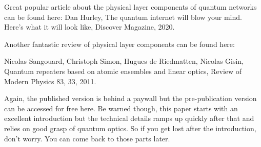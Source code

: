 Great popular article about the physical layer components of quantum networks can be found here:
Dan Hurley, The quantum internet will blow your mind. Here’s what it will look like, Discover Magazine, 2020.

Another fantastic review of physical layer components can be found here:

Nicolas Sangouard, Christoph Simon, Hugues de Riedmatten, Nicolas Gisin, Quantum repeaters based on atomic ensembles and linear optics, Review of Modern Physics 83, 33, 2011.

Again, the published version is behind a paywall but the pre-publication version can be accessed for free here. Be warned though, this paper starts with an excellent introduction but the technical details ramps up quickly after that and relies on good grasp of quantum optics. So if you get lost after the introduction, don’t worry. You can come back to those parts later.
